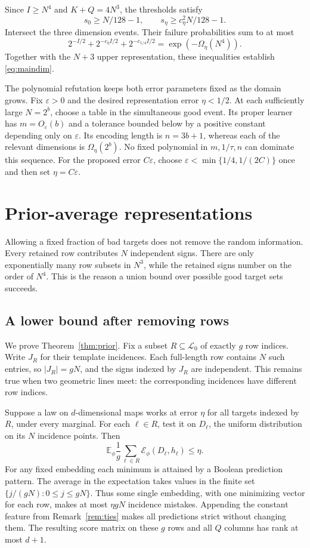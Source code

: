 \documentclass[11pt,letterpaper,pmlr,twoside]{jmlr}
\newcommand{\Lc}{\mathcal L}
\newcommand{\E}{\mathbb E}
\newcommand{\eps}{\varepsilon}
\begin{document}
Since $I\ge N^4$ and $K+Q=4N^3$, the thresholds satisfy
\[
 s_0\ge N/128-1,\qquad
 s_\eta\ge c_\eta^2N/128-1.
\]
Intersect the three dimension events. Their failure probabilities sum to at most
\[
 2^{-I/2}+2^{-c_\eta I/2}+2^{-c_{1/4}I/2}
 =\exp(-\Omega_\eta(N^4)).
\]
Together with the $N+3$ upper representation, these inequalities establish \eqref{eq:maindim}.

The polynomial refutation keeps both error parameters fixed as the domain grows. Fix $\eps>0$ and the desired representation error $\eta<1/2$. At each sufficiently large $N=2^b$, choose a table in the simultaneous good event. Its proper learner has $m=O_\eps(b)$ and a tolerance bounded below by a positive constant depending only on $\eps$. Its encoding length is $n=3b+1$, whereas each of the relevant dimensions is $\Omega_\eta(2^b)$. No fixed polynomial in $m,1/\tau,n$ can dominate this sequence. For the proposed error $C\eps$, choose $\eps<\min\{1/4,1/(2C)\}$ once and then set $\eta=C\eps$.

\section{Prior-average representations}\label{app:prior}
Allowing a fixed fraction of bad targets does not remove the random information. Every retained row contributes $N$ independent signs. There are only exponentially many row subsets in $N^3$, while the retained signs number on the order of $N^4$. This is the reason a union bound over possible good target sets succeeds.

\subsection{A lower bound after removing rows}
We prove Theorem~\ref{thm:prior}. Fix a subset $R\subseteq\Lc_0$ of exactly $g$ row indices. Write $J_R$ for their template incidences. Each full-length row contains $N$ such entries, so $|J_R|=gN$, and the signs indexed by $J_R$ are independent. This remains true when two geometric lines meet: the corresponding incidences have different row indices.

Suppose a law on $d$-dimensional maps works at error $\eta$ for all targets indexed by $R$, under every marginal. For each $\ell\in R$, test it on $D_\ell$, the uniform distribution on its $N$ incidence points. Then
\[
 \E_\phi\frac1g\sum_{\ell\in R}\mathcal E_\phi(D_\ell,h_\ell)\le\eta.
\]
For any fixed embedding each minimum is attained by a Boolean prediction pattern. The average in the expectation takes values in the finite set $\{j/(gN):0\le j\le gN\}$. Thus some single embedding, with one minimizing vector for each row, makes at most $\eta gN$ incidence mistakes. Appending the constant feature from Remark~\ref{rem:ties} makes all predictions strict without changing them. The resulting score matrix on these $g$ rows and all $Q$ columns has rank at most $d+1$.
\end{document}
